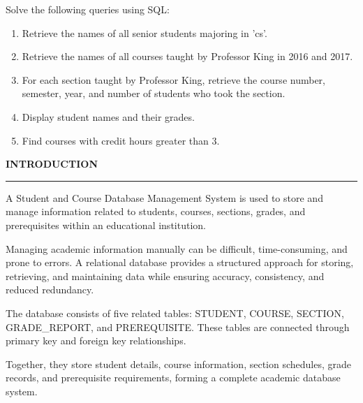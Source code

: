 \documentclass[12pt,a4paper]{report}
\begin{document}
\vspace{0.2cm}

Solve the following queries using SQL:

\begin{enumerate}
\item Retrieve the names of all senior students majoring in 'cs'.

\item Retrieve the names of all courses taught by Professor King in 2016 and 2017.

\item For each section taught by Professor King, retrieve the course number, semester, year, and number of students who took the section.

\item Display student names and their grades.

\item Find courses with credit hours greater than 3.
\end{enumerate}

\vspace{0.6cm}

\begin{center}
\Large\textbf{INTRODUCTION}
\end{center}

\hrule
\vspace{0.4cm}

\noindent
A Student and Course Database Management System is used to store and manage information related to students, courses, sections, grades, and prerequisites within an educational institution.

\vspace{0.2cm}

\noindent
Managing academic information manually can be difficult, time-consuming, and prone to errors. A relational database provides a structured approach for storing, retrieving, and maintaining data while ensuring accuracy, consistency, and reduced redundancy.

\vspace{0.2cm}

\noindent
The database consists of five related tables: STUDENT, COURSE, SECTION, GRADE\_REPORT, and PREREQUISITE. These tables are connected through primary key and foreign key relationships.

\vspace{0.2cm}

\noindent
Together, they store student details, course information, section schedules, grade records, and prerequisite requirements, forming a complete academic database system.
\end{document}
